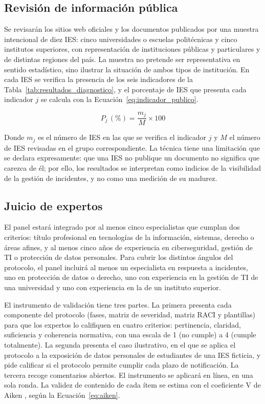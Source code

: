 \subsection{Revisión de información pública}
Se revisarán los sitios web oficiales y los documentos publicados por una muestra intencional de diez IES: cinco universidades o escuelas politécnicas y cinco institutos superiores, con representación de instituciones públicas y particulares y de distintas regiones del país. La muestra no pretende ser representativa en sentido estadístico, sino ilustrar la situación de ambos tipos de institución. En cada IES se verifica la presencia de los seis indicadores de la Tabla~\ref{tab:resultados_diagnostico}, y el porcentaje de IES que presenta cada indicador $j$ se calcula con la Ecuación~\ref{eq:indicador_publico}.

\begin{equation}
\label{eq:indicador_publico}
P_j\,(\%) = \frac{m_j}{M} \times 100
\end{equation}

Donde $m_j$ es el número de IES en las que se verifica el indicador $j$ y $M$ el número de IES revisadas en el grupo correspondiente. La técnica tiene una limitación que se declara expresamente: que una IES no publique un documento no significa que carezca de él; por ello, los resultados se interpretan como indicios de la visibilidad de la gestión de incidentes, y no como una medición de su madurez.

\subsection{Juicio de expertos}
El panel estará integrado por al menos cinco especialistas que cumplan dos criterios: título profesional en tecnologías de la información, sistemas, derecho o áreas afines, y al menos cinco años de experiencia en ciberseguridad, gestión de TI o protección de datos personales. Para cubrir los distintos ángulos del protocolo, el panel incluirá al menos un especialista en respuesta a incidentes, uno en protección de datos o derecho, uno con experiencia en la gestión de TI de una universidad y uno con experiencia en la de un instituto superior.

El instrumento de validación tiene tres partes. La primera presenta cada componente del protocolo (fases, matriz de severidad, matriz RACI y plantillas) para que los expertos lo califiquen en cuatro criterios: pertinencia, claridad, suficiencia y coherencia normativa, con una escala de 1 (no cumple) a 4 (cumple totalmente). La segunda presenta el caso ilustrativo, en el que se aplica el protocolo a la exposición de datos personales de estudiantes de una IES ficticia, y pide calificar si el protocolo permite cumplir cada plazo de notificación. La tercera recoge comentarios abiertos. El instrumento se aplicará en línea, en una sola ronda. La validez de contenido de cada ítem se estima con el coeficiente V de Aiken \cite{aiken1985}, según la Ecuación~\ref{eq:aiken}.

